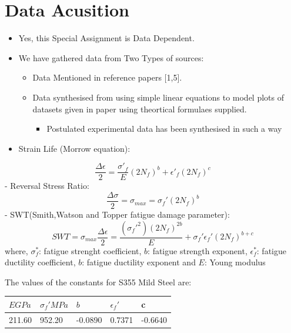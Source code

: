 \documentclass[11pt]{article}
\providecommand{\tightlist}{%
      \setlength{\itemsep}{0pt}\setlength{\parskip}{0pt}}
\begin{document}
\hypertarget{data-acusition}{%
\section{Data Acusition}\label{data-acusition}}

\begin{itemize}
\tightlist
\item
  Yes, this Special Assignment is Data Dependent.
\item
  We have gathered data from Two Types of sources:

  \begin{itemize}
  \tightlist
  \item
    Data Mentioned in reference papers {[}1,5{]}.
  \item
    Data synthesised from using simple linear equations to model plots
    of datasets given in paper using theortical formulaes supplied.

    \begin{itemize}
    \tightlist
    \item
      Postulated experimental data has been synthesised in such a way
    \end{itemize}
  \end{itemize}
\end{itemize}

\begin{itemize}
\tightlist
\item
  Strain Life (Morrow equation):
\end{itemize}

\[
\frac{\Delta \epsilon}{2} = \frac{\sigma'_f}{E}(2N_f)^b + \epsilon'_f(2N_f)^c
\] - Reversal Stress Ratio: \[
\frac{\Delta \sigma}{2} = \sigma_{max} = \sigma_f'(2N_f)^b 
\] - SWT(Smith,Watson and Topper fatigue damage parameter): \[
SWT = \sigma_{max}\frac{\Delta\epsilon}{2} = \frac{(\sigma_f'^2)(2N_f)^{2b}}{E} + \sigma_f'\epsilon_f'(2N_f)^{b+c}
\] where, \(\sigma^*_f\): fatigue strenght coefficient, \(b\): fatigue
strength exponent, \(\epsilon^*_f\): fatigue ductility coefficient,
\(b\): fatigue ductility exponent and \(E\): Young modulus

The values of the constants for S355 Mild Steel are:

\begin{longtable}[]{@{}lllll@{}}
\toprule
\(E GPa\) & \(\sigma_f' MPa\) & \(b\) & \(\epsilon_f'\) &
c\tabularnewline
\midrule
\endhead
211.60 & 952.20 & -0.0890 & 0.7371 & -0.6640\tabularnewline
\bottomrule
\end{longtable}
\end{document}
